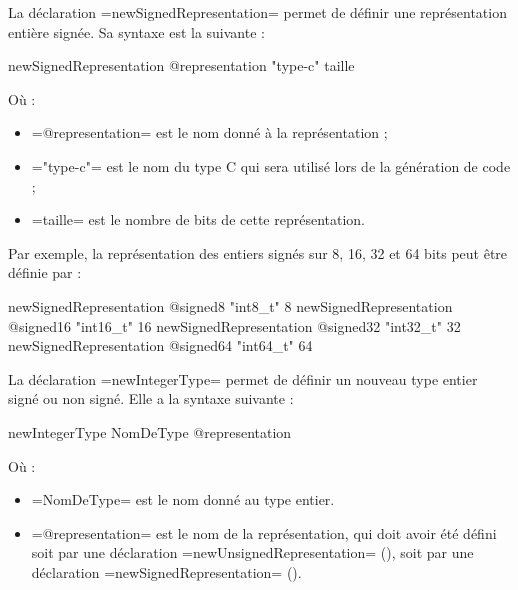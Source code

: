 
La déclaration \plm=newSignedRepresentation= permet de définir une représentation entière signée. Sa syntaxe est la suivante :


\begin{PLM}
newSignedRepresentation @representation "type-c" taille
\end{PLM}

Où :
\begin{itemize}
  \item \plm=@representation= est le nom donné à la représentation ;
  \item \plm="type-c"= est le nom du type C qui sera utilisé lors de la génération de code ;
  \item \plm=taille= est le nombre de bits de cette représentation.
\end{itemize}

Par exemple, la représentation des entiers signés sur 8, 16, 32 et 64 bits peut être définie par :
\begin{PLM}
newSignedRepresentation @signed8  "int8_t"   8
newSignedRepresentation @signed16 "int16_t" 16
newSignedRepresentation @signed32 "int32_t" 32
newSignedRepresentation @signed64 "int64_t" 64
\end{PLM}












La déclaration \plm=newIntegerType= permet de définir un nouveau type entier signé ou non signé. Elle a la syntaxe suivante :
\begin{PLM}
newIntegerType NomDeType @representation
\end{PLM}
Où :
\begin{itemize}
  \item \plm=NomDeType= est le nom donné au type entier.
  \item \plm=@representation= est le nom de la représentation, qui doit avoir été défini soit par une déclaration \plm=newUnsignedRepresentation= (), soit par une déclaration \plm=newSignedRepresentation= ().
\end{itemize}

